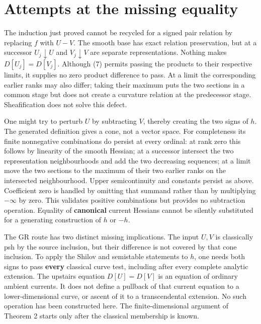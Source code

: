 \documentclass[
  11pt,
]{article}
\begin{document}
\section{Attempts at the missing
equality}\label{attempts-at-the-missing-equality}

The induction just proved cannot be recycled for a signed pair relation
by replacing \(f\) with \(U-V\). The smooth base has exact relation
preservation, but at a successor \(U_j\downarrow U\) and
\(V_j\downarrow V\) are separate representations. Nothing makes
\(D[U_j]=D[V_j]\). Although (7) permits passing the products to their
respective limits, it supplies no zero product difference to pass. At a
limit the corresponding earlier ranks may also differ; taking their
maximum puts the two sections in a common stage but does not create a
curvature relation at the predecessor stage. Sheafification does not
solve this defect.

One might try to perturb \(U\) by subtracting \(V\), thereby creating
the two signs of \(h\). The generated definition gives a cone, not a
vector space. For completeness its finite nonnegative combinations do
persist at every ordinal: at rank zero this follows by linearity of the
smooth Hessian; at a successor intersect the two representation
neighbourhoods and add the two decreasing sequences; at a limit move the
two sections to the maximum of their two earlier ranks on the
intersected neighbourhood. Upper semicontinuity and constants persist as
above. Coefficient zero is handled by omitting that summand rather than
by multiplying \(-\infty\) by zero. This validates positive combinations
but provides no subtraction operation. Equality of \textbf{canonical}
current Hessians cannot be silently substituted for a generating
construction of \(h\) or \(-h\).

The GR route has two distinct missing implications. The input \(U,V\) is
classically psh by the source inclusion, but their difference is not
covered by that cone inclusion. To apply the Shilov and semistable
statements to \(h\), one needs both signs to pass \textbf{every}
classical curve test, including after every complete analytic extension.
The upstairs equation \(D[U]=D[V]\) is an equation of ordinary ambient
currents. It does not define a pullback of that current equation to a
lower-dimensional curve, or ascent of it to a transcendental extension.
No such operation has been constructed here. The finite-dimensional
argument of Theorem 2 starts only after the classical membership is
known.
\end{document}

